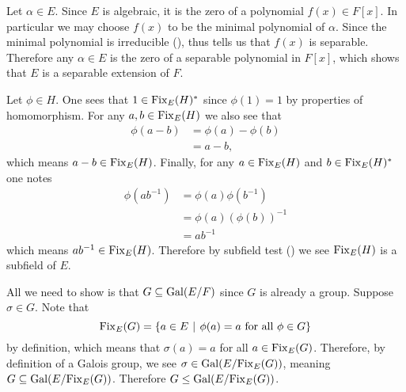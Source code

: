 \begin{questions}
    \item Let $\alpha \in E$. Since $E$ is algebraic, it is the zero of a polynomial $f(x) \in F[x]$. In particular we may choose $f(x)$ to be the minimal polynomial of $\alpha$. Since the minimal polynomial is irreducible (), thus  tells us that $f(x)$ is separable. Therefore any $\alpha \in E$ is the zero of a separable polynomial in $F[x]$, which shows that $E$ is a separable extension of $F$.

    \item Let $\phi \in H$. One sees that $1 \in \mathrm{Fix}_{E}(H)^\ast$ since $\phi(1) = 1$ by properties of homomorphism. For any $a, b \in \mathrm{Fix}_{E}(H)$ we also see that
    \begin{align*}
        \phi(a - b) &= \phi(a) - \phi(b)\\
        &= a - b,
    \end{align*}
    which means $a - b \in \mathrm{Fix}_{E}(H)$. Finally, for any $a \in \mathrm{Fix}_{E}(H)$ and $b \in \mathrm{Fix}_{E}(H)^\ast$ one notes
    \begin{align*}
        \phi(ab^{-1}) &= \phi(a)\phi(b^{-1})\\
        &= \phi(a)\left(\phi(b)\right)^{-1}\\
        &= ab^{-1}
    \end{align*}
    which means $ab^{-1} \in \mathrm{Fix}_{E}(H)$. Therefore by subfield test () we see $\mathrm{Fix}_{E}(H)$ is a subfield of $E$.

    \item All we need to show is that $G \subseteq \mathrm{Gal}(E/F)$ since $G$ is already a group. Suppose $\sigma \in G$. Note that
    \[
        \Fix{E}{G} = \{a \in E \vert \phi(a) = a \text{ for all } \phi \in G\}
    \]
    by definition, which means that $\sigma(a) = a$ for all $a \in \mathrm{Fix}_{E}(G)$. Therefore, by definition of a Galois group, we see $\sigma \in \mathrm{Gal}(E/\mathrm{Fix}_{E}(G))$, meaning $G \subseteq \mathrm{Gal}(E/\mathrm{Fix}_{E}(G))$. Therefore $G \leq \mathrm{Gal}(E/\mathrm{Fix}_{E}(G))$.


\end{questions}
